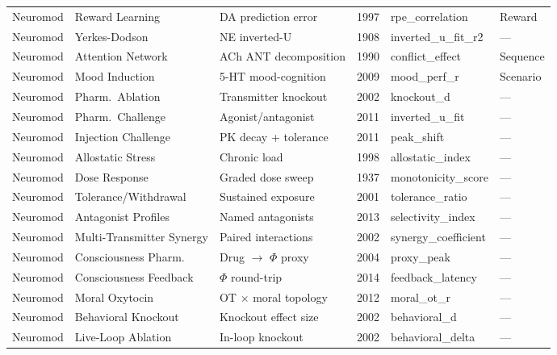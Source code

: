 \documentclass[10pt,landscape]{article}
\begin{document}
\begin{longtable}{@{}p{2.3cm}p{3.0cm}p{4.5cm}p{0.6cm}p{3.8cm}p{1.8cm}@{}}
\midrule
Neuromod & Reward Learning & DA prediction error \citep{schultz1997dopamine} & 1997 & rpe\_correlation & Reward \\
Neuromod & Yerkes-Dodson & NE inverted-U \citep{yerkes1908relation} & 1908 & inverted\_u\_fit\_r2 & --- \\
Neuromod & Attention Network & ACh ANT decomposition & 1990 & conflict\_effect & Sequence \\
Neuromod & Mood Induction & 5-HT mood-cognition & 2009 & mood\_perf\_r & Scenario \\
Neuromod & Pharm.\ Ablation & Transmitter knockout & 2002 & knockout\_d & --- \\
Neuromod & Pharm.\ Challenge & Agonist/antagonist & 2011 & inverted\_u\_fit & --- \\
Neuromod & Injection Challenge & PK decay + tolerance & 2011 & peak\_shift & --- \\
Neuromod & Allostatic Stress & Chronic load & 1998 & allostatic\_index & --- \\
Neuromod & Dose Response & Graded dose sweep & 1937 & monotonicity\_score & --- \\
Neuromod & Tolerance/Withdrawal & Sustained exposure & 2001 & tolerance\_ratio & --- \\
Neuromod & Antagonist Profiles & Named antagonists & 2013 & selectivity\_index & --- \\
Neuromod & Multi-Transmitter Synergy & Paired interactions & 2002 & synergy\_coefficient & --- \\
Neuromod & Consciousness Pharm. & Drug $\to$ $\Phi$ proxy & 2004 & proxy\_peak & --- \\
Neuromod & Consciousness Feedback & $\Phi$ round-trip & 2014 & feedback\_latency & --- \\
Neuromod & Moral Oxytocin & OT $\times$ moral topology & 2012 & moral\_ot\_r & --- \\
Neuromod & Behavioral Knockout & Knockout effect size & 2002 & behavioral\_d & --- \\
Neuromod & Live-Loop Ablation & In-loop knockout & 2002 & behavioral\_delta & --- \\

\end{longtable}



\end{document}
